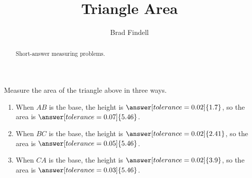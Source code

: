 \documentclass[nooutcomes]{ximera}
\title{Triangle Area}
\author{Brad Findell}
\begin{document}
\begin{abstract}
Short-answer measuring problems. 
\end{abstract}
\maketitle

\begin{problem}
\begin{center}  
\end{center}
Measure the area of the triangle above in three ways.  
\begin{enumerate}
\item When $AB$ is the base, the height is $\answer[tolerance=0.02]{1.7}$, so the area is $\answer[tolerance=0.07]{5.46}$.
\item When $BC$ is the base, the height is $\answer[tolerance=0.02]{2.41}$, so the area is $\answer[tolerance=0.05]{5.46}$.
\item When $CA$ is the base, the height is $\answer[tolerance=0.02]{3.9}$, so the area is $\answer[tolerance=0.03]{5.46}$.
\end{enumerate}
\end{problem}
\end{document}
